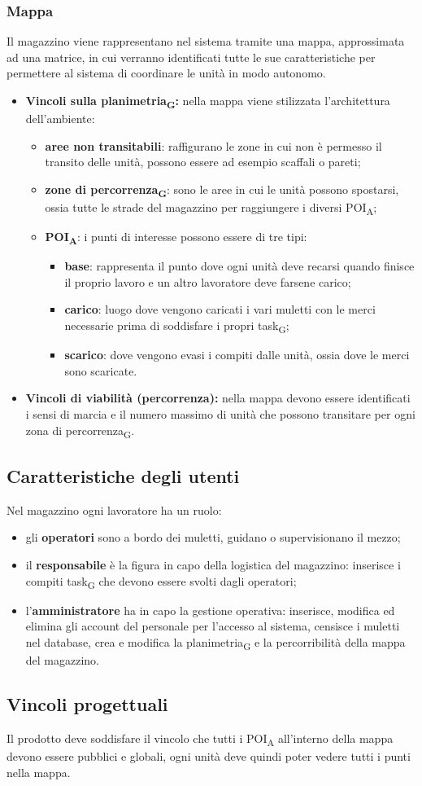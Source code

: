 \subsubsection{Mappa}
Il magazzino viene rappresentano nel sistema tramite una mappa, approssimata ad una matrice, in cui verranno identificati tutte le sue caratteristiche per permettere al sistema di coordinare le unità in modo autonomo.
\begin{itemize}
	\item \textbf{Vincoli sulla planimetria\textsubscript{G}:} nella mappa viene stilizzata l'architettura dell'ambiente:
	\begin{itemize}
		\item \textbf{aree non transitabili}: raffigurano le zone in cui non è permesso il transito delle unità, possono essere ad esempio scaffali o pareti;
		\item \textbf{zone di percorrenza\textsubscript{G}}: sono le aree in cui le unità possono spostarsi, ossia tutte le strade del magazzino per raggiungere i diversi POI\textsubscript{A};
		\item \textbf{POI\textsubscript{A}}: i punti di interesse possono essere di tre tipi:
		\begin{itemize}
			\item \textbf{base}: rappresenta il punto dove ogni unità deve recarsi quando finisce il proprio lavoro e un altro lavoratore deve farsene carico;
			\item \textbf{carico}: luogo dove vengono caricati i vari muletti con le merci necessarie prima di soddisfare i propri task\textsubscript{G};
			\item \textbf{scarico}: dove vengono evasi i compiti dalle unità, ossia dove le merci sono scaricate.
		\end{itemize}
	\end{itemize}
	\item \textbf{Vincoli di viabilità (percorrenza):} nella mappa devono essere identificati i sensi di marcia e il numero massimo di unità che possono transitare per ogni zona di percorrenza\textsubscript{G}.
	
\end{itemize}

\subsection{Caratteristiche degli utenti}
Nel magazzino ogni lavoratore ha un ruolo: 
\begin{itemize}
	\item gli \textbf{operatori} sono a bordo dei muletti, guidano o supervisionano il mezzo;
	\item il \textbf{responsabile} è la figura in capo della logistica del magazzino: inserisce i compiti task\textsubscript{G} che devono essere svolti dagli operatori; 
	\item l'\textbf{amministratore} ha in capo la gestione operativa: inserisce, modifica ed elimina gli account del personale per l'accesso al sistema, censisce i muletti nel database, crea e modifica la planimetria\textsubscript{G} e la percorribilità della mappa del magazzino.
\end{itemize}
\subsection{Vincoli progettuali}
Il prodotto deve soddisfare il vincolo che tutti i POI\textsubscript{A} all'interno della mappa devono essere pubblici e globali, ogni unità deve quindi poter vedere tutti i punti nella mappa.